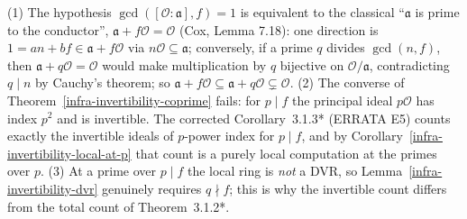 \begin{remark}\label{infra-invertibility-remarks}
  (1) The hypothesis $\gcd([\mathcal{O} : \mathfrak{a}], f) = 1$ is equivalent
  to the classical ``$\mathfrak{a}$ is prime to the conductor'',
  $\mathfrak{a} + f\mathcal{O} = \mathcal{O}$ (Cox, Lemma 7.18): one direction
  is $1 = an + bf \in \mathfrak{a} + f\mathcal{O}$ via
  $n\mathcal{O} \subseteq \mathfrak{a}$; conversely, if a prime $q$ divides
  $\gcd(n, f)$, then $\mathfrak{a} + q\mathcal{O} = \mathcal{O}$ would make
  multiplication by $q$ bijective on $\mathcal{O}/\mathfrak{a}$, contradicting
  $q \mid n$ by Cauchy's theorem; so
  $\mathfrak{a} + f\mathcal{O} \subseteq \mathfrak{a} + q\mathcal{O} \subsetneq \mathcal{O}$.
  (2) The converse of Theorem~\ref{infra-invertibility-coprime} fails: for
  $p \mid f$ the principal ideal $p\mathcal{O}$ has index $p^2$ and is
  invertible. The corrected Corollary~3.1.3* (ERRATA E5) counts exactly the
  invertible ideals of $p$-power index for $p \mid f$, and by
  Corollary~\ref{infra-invertibility-local-at-p} that count is a purely local
  computation at the primes over $p$.
  (3) At a prime over $p \mid f$ the local ring is \emph{not} a DVR, so
  Lemma~\ref{infra-invertibility-dvr} genuinely requires $q \nmid f$; this is
  why the invertible count differs from the total count of Theorem~3.1.2*.
\end{remark}
